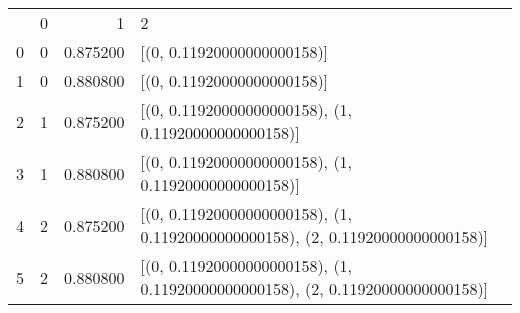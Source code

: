 \begin{tabular}{lrrl}
 & 0 & 1 & 2 \\
0 & 0 & 0.875200 & [(0, 0.11920000000000158)] \\
1 & 0 & 0.880800 & [(0, 0.11920000000000158)] \\
2 & 1 & 0.875200 & [(0, 0.11920000000000158), (1, 0.11920000000000158)] \\
3 & 1 & 0.880800 & [(0, 0.11920000000000158), (1, 0.11920000000000158)] \\
4 & 2 & 0.875200 & [(0, 0.11920000000000158), (1, 0.11920000000000158), (2, 0.11920000000000158)] \\
5 & 2 & 0.880800 & [(0, 0.11920000000000158), (1, 0.11920000000000158), (2, 0.11920000000000158)] \\
\end{tabular}

